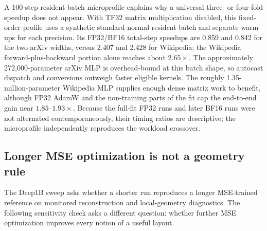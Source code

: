 \documentclass[10pt]{article}
\begin{document}
A 100-step resident-batch microprofile explains why a universal three- or four-fold
speedup does not appear.  With TF32 matrix multiplication disabled, this fixed-order
profile uses a synthetic standard-normal resident batch and separate warm-ups for each
precision.  Its FP32/BF16 total-step speedups are 0.859 and 0.842 for the two arXiv
widths, versus 2.407 and 2.428 for Wikipedia; the Wikipedia forward-plus-backward portion
alone reaches about $2.65\times$.  The approximately 272,000-parameter arXiv MLP is
overhead-bound at this batch shape, so autocast dispatch and conversions outweigh faster
eligible kernels.  The roughly 1.35-million-parameter Wikipedia MLP supplies enough
dense matrix work to benefit, although FP32 AdamW and the non-training parts of the fit
cap the end-to-end gain near $1.85$--$1.93\times$.  Because the full-fit FP32 runs and
later BF16 runs were not alternated contemporaneously, their timing ratios are
descriptive; the microprofile independently reproduces the workload crossover.

\subsection{Longer MSE optimization is not a geometry rule}

The Deep1B sweep asks whether a shorter run reproduces a longer MSE-trained reference
on monitored reconstruction and local-geometry diagnostics.  The following sensitivity
check asks a different question: whether further MSE optimization improves every notion
of a useful layout.

\begin{table}[ht]
\centering
\scriptsize
\setlength{\tabcolsep}{3.2pt}
\caption{Reducer-seed-0 400-epoch-cap sensitivity checks for the two original benchmark
cells only: arXiv $d=2$ and Wikipedia $d=8$.  DTW columns average the three fixed
evaluation samples.  Longer training lowers native reconstruction error and improves
some local scores, while several global and sampled-topology scores worsen.}
\label{tab:sensitivity}
\end{table}
\end{document}
